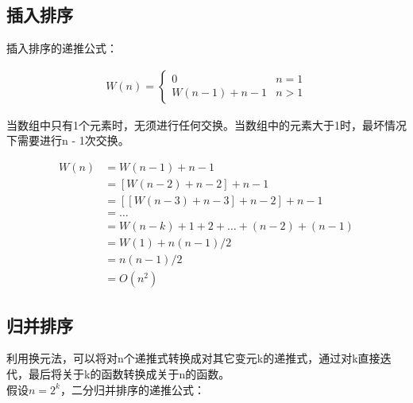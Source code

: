 \vspace{0.5cm}

\subsection{插入排序}

插入排序的递推公式：

\vspace{-0.5cm}

\begin{align*}
	W(n) = \begin{cases}
		0                & n = 1 \\
		W(n - 1) + n - 1 & n > 1
	\end{cases}
\end{align*}

当数组中只有1个元素时，无须进行任何交换。当数组中的元素大于1时，最坏情况下需要进行n - 1次交换。

\vspace{-1cm}

\begin{align*}
	W(n) & = W(n - 1) + n - 1                             \\
	     & = [W(n - 2) + n - 2] + n - 1                   \\
	     & = [[W(n - 3) + n - 3] + n - 2] + n - 1         \\
	     & = \dots                                        \\
	     & = W(n - k) + 1 + 2 + \dots + (n - 2) + (n - 1) \\
	     & = W(1) + n(n - 1) / 2                          \\
	     & = n(n - 1) / 2                                 \\
	     & = O(n^2)
\end{align*}

\vspace{0.5cm}

\subsection{归并排序}

利用换元法，可以将对n个递推式转换成对其它变元k的递推式，通过对k直接迭代，最后将关于k的函数转换成关于n的函数。\\

假设$ n = 2^k $，二分归并排序的递推公式：

\vspace{-0.5cm}

